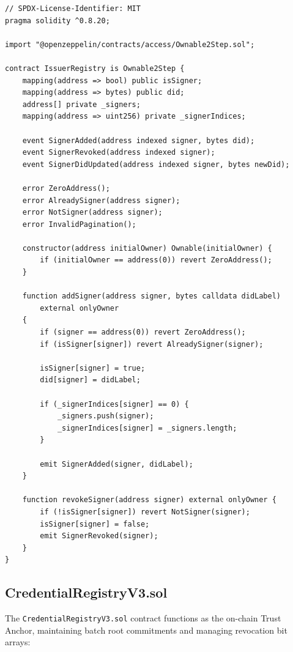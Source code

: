 \begin{lstlisting}[language=Solidity]
// SPDX-License-Identifier: MIT
pragma solidity ^0.8.20;

import "@openzeppelin/contracts/access/Ownable2Step.sol";

contract IssuerRegistry is Ownable2Step {
    mapping(address => bool) public isSigner;
    mapping(address => bytes) public did;
    address[] private _signers;
    mapping(address => uint256) private _signerIndices;

    event SignerAdded(address indexed signer, bytes did);
    event SignerRevoked(address indexed signer);
    event SignerDidUpdated(address indexed signer, bytes newDid);

    error ZeroAddress();
    error AlreadySigner(address signer);
    error NotSigner(address signer);
    error InvalidPagination();

    constructor(address initialOwner) Ownable(initialOwner) {
        if (initialOwner == address(0)) revert ZeroAddress();
    }

    function addSigner(address signer, bytes calldata didLabel) 
        external onlyOwner 
    {
        if (signer == address(0)) revert ZeroAddress();
        if (isSigner[signer]) revert AlreadySigner(signer);

        isSigner[signer] = true;
        did[signer] = didLabel;

        if (_signerIndices[signer] == 0) {
            _signers.push(signer);
            _signerIndices[signer] = _signers.length;
        }

        emit SignerAdded(signer, didLabel);
    }

    function revokeSigner(address signer) external onlyOwner {
        if (!isSigner[signer]) revert NotSigner(signer);
        isSigner[signer] = false;
        emit SignerRevoked(signer);
    }
}
\end{lstlisting}

\subsection{CredentialRegistryV3.sol}

The \texttt{CredentialRegistryV3.sol} contract functions as the on-chain Trust Anchor, maintaining batch root commitments and managing revocation bit arrays:


